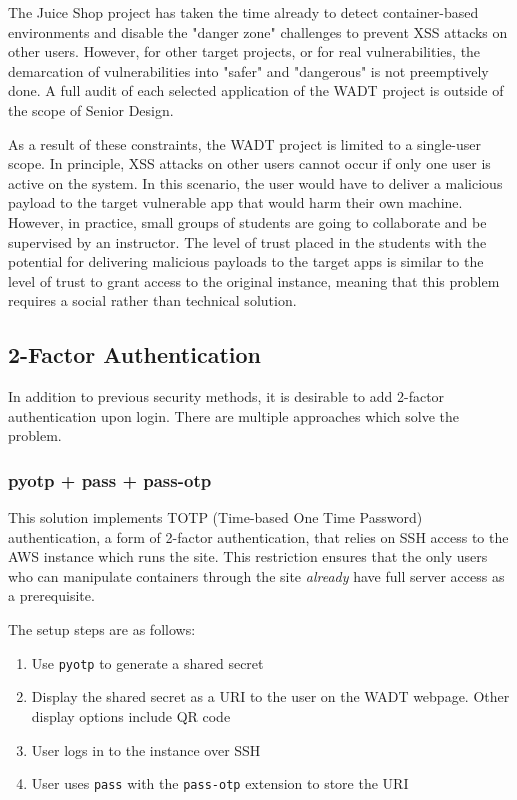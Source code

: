 \documentclass[12pt,titlepage]{article}
\begin{document}
The Juice Shop project has taken the time already to detect container-based environments and disable the "danger zone" challenges to prevent XSS attacks on other users. However, for other target projects, or for real vulnerabilities, the demarcation of vulnerabilities into "safer" and "dangerous" is not preemptively done. A full audit of each selected application of the WADT project is outside of the scope of Senior Design.

As a result of these constraints, the WADT project is limited to a single-user scope. In principle, XSS attacks on other users cannot occur if only one user is active on the system. In this scenario, the user would have to deliver a malicious payload to the target vulnerable app that would harm their own machine. However, in practice, small groups of students are going to collaborate and be supervised by an instructor. The level of trust placed in the students with the potential for delivering malicious payloads to the target apps is similar to the level of trust to grant access to the original instance, meaning that this problem requires a social rather than technical solution.

\subsection{2-Factor Authentication}
In addition to previous security methods, it is desirable to add 2-factor authentication upon login. There are multiple approaches which solve the problem.

\subsubsection{pyotp + pass + pass-otp}
This solution implements TOTP (Time-based One Time Password) authentication, a form of 2-factor authentication, that relies on SSH access to the AWS instance which runs the site. This restriction ensures that the only users who can manipulate containers through the site \textit{already} have full server access as a prerequisite.

The setup steps are as follows:
\begin{enumerate}
	\item Use \texttt{pyotp} to generate a shared secret
	\item Display the shared secret as a URI to the user on the WADT webpage. Other display options include QR code
	\item User logs in to the instance over SSH
	\item User uses \texttt{pass} with the \texttt{pass-otp} extension to store the URI
\end{enumerate}
\end{document}
